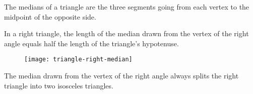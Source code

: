 \begin{definition}
The medians of a triangle are the three segments going from each vertex to the midpoint of the opposite side.
\end{definition}

\begin{theorem}
In a right triangle, the length of the median drawn from the vertex of the right angle equals half the length of the triangle's hypotenuse.
\end{theorem}
\begin{figure}[H]
\centering
\texttt{[image: triangle-right-median]}
\end{figure}
The median drawn from the vertex of the right angle always splits the right triangle into two isosceles triangles.
